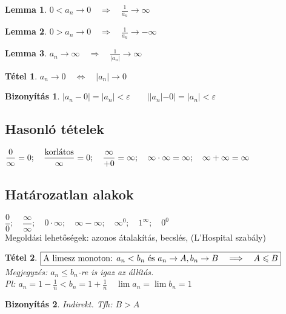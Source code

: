 \documentclass[a4paper,12pt,twoside]{book}
\newtheorem{tetel}{Tétel}[chapter]
\newtheorem{lemma}{Lemma}[chapter]
\theoremstyle{break}
\newtheorem{biz}{Bizonyítás}[chapter]
\theoremstyle{plain}
\begin{document}
\begin{lemma}\label{Poz0RecpirokaTartVegtelen}$\boxed{0<a_n\to 0 \quad \Longrightarrow \quad \frac{1}{a_n}\to\infty}$\end{lemma}
\begin{lemma}$\boxed{0>a_n\to 0 \quad \Longrightarrow \quad \frac{1}{a_n}\to -\infty}$\end{lemma}
\begin{lemma}$\boxed{a_n\to\infty \quad \Longrightarrow \quad \frac{1}{|a_n|}\to \infty}$\end{lemma}

\begin{tetel}$\boxed{a_n\to 0 \quad \Longleftrightarrow \quad |a_n|\to 0}$\end{tetel}
\begin{biz}$|a_n-0|=|a_n|<\varepsilon \qquad ||a_n|-0|=|a_n|<\varepsilon$
\end{biz}

\subsection{Hasonló tételek}

$\dfrac{0}{\infty}=0; \quad \dfrac{\hbox{korlátos}}{\infty}=0; \quad \dfrac{\infty}{+0}=\infty; \quad \infty\cdot\infty=\infty; \quad \infty+\infty=\infty$

\subsection{Határozatlan alakok}
$\dfrac{0}{0}; \quad \dfrac{\infty}{\infty}; \quad 0\cdot\infty; \quad \infty - \infty; \quad \infty^0; \quad 1^\infty; \quad 0^0$\\
Megoldási lehetőségek: azonos átalakítás, becslés, (L'Hospital szabály)

\begin{tetel}$\boxed{$A limesz monoton: $a_n<b_n$ és $a_n\to A, b_n\to B \quad \Longrightarrow \quad A\leqslant B}$\\
\textit{Megjegyzés}: $a_n\leqslant b_n$-re is igaz az állítás.\\
\textit{Pl}: $a_n=1-\frac{1}{n}<b_n=1+\frac{1}{n} \quad \lim a_n = \lim b_n = 1$\end{tetel}
\begin{biz}Indirekt. Tfh: $B>A$\end{biz} %
\end{document}
